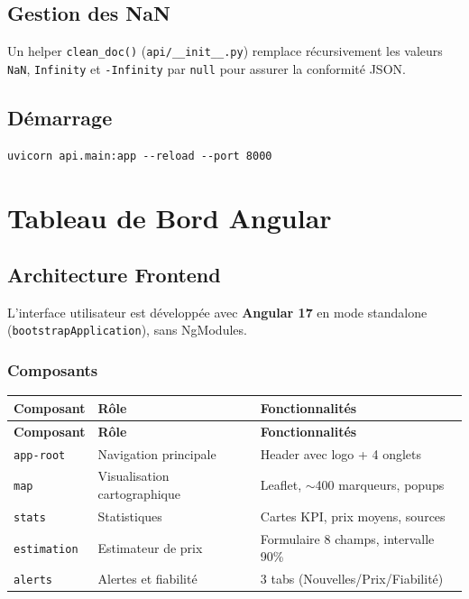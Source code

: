 \documentclass[12pt,a4paper]{report}
\begin{document}
\section{Gestion des NaN}

Un helper \texttt{clean\_doc()} (\texttt{api/\_\_init\_\_.py}) remplace récursivement les valeurs \texttt{NaN}, \texttt{Infinity} et \texttt{-Infinity} par \texttt{null} pour assurer la conformité JSON.

\section{Démarrage}
\begin{verbatim}
uvicorn api.main:app --reload --port 8000
\end{verbatim}

\chapter{Tableau de Bord Angular}

\section{Architecture Frontend}

L'interface utilisateur est développée avec \textbf{Angular 17} en mode standalone (\texttt{bootstrapApplication}), sans NgModules.

\subsection{Composants}

\begin{longtable}{lll}
\toprule
\textbf{Composant} & \textbf{Rôle} & \textbf{Fonctionnalités} \\
\midrule
\endfirsthead
\toprule
\textbf{Composant} & \textbf{Rôle} & \textbf{Fonctionnalités} \\
\midrule
\endhead
\bottomrule
\endfoot
\texttt{app-root} & Navigation principale & Header avec logo + 4 onglets \\
\texttt{map} & Visualisation cartographique & Leaflet, $\sim$400 marqueurs, popups \\
\texttt{stats} & Statistiques & Cartes KPI, prix moyens, sources \\
\texttt{estimation} & Estimateur de prix & Formulaire 8 champs, intervalle 90\% \\
\texttt{alerts} & Alertes et fiabilité & 3 tabs (Nouvelles/Prix/Fiabilité) \\
\bottomrule
\end{longtable}
\end{document}
